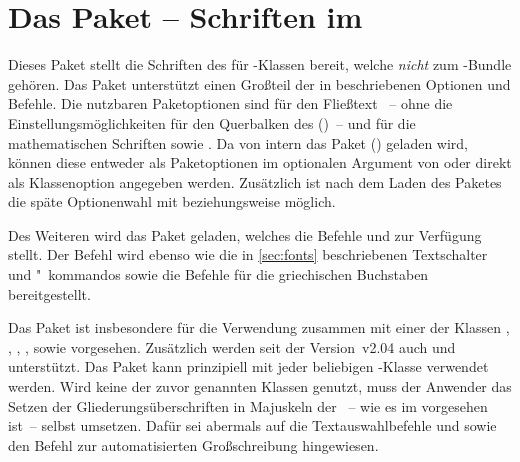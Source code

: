 \begin{Declaration*}{}
\bigskip\noindent
{}%
\end{Declaration*}



\section{Das Paket  -- Schriften im \CD}
\begin{Declaration*}[v2.02]{}
\printchangedatlist
%
Dieses Paket stellt die Schriften des \CDs für -Klassen bereit, 
welche \emph{nicht} zum \TUDScript-Bundle gehören. Das Paket unterstützt einen 
Großteil der in  beschriebenen Optionen und Befehle. Die 
nutzbaren Paketoptionen sind für den Fließtext ~-- ohne die 
Einstellungsmöglichkeiten für den Querbalken des \CDs ()~-- und 
für die mathematischen Schriften  sowie . 
Da von  intern das Paket () geladen 
wird, können diese entweder als Paketoptionen im optionalen Argument von 
 oder direkt 
als Klassenoption angegeben werden. Zusätzlich ist nach dem Laden des Paketes 
die späte Optionenwahl mit  beziehungsweise  
möglich.

Des Weiteren wird das Paket  geladen, welches die Befehle 
 und  zur Verfügung stellt. Der 
Befehl  wird ebenso wie die in \autoref{sec:fonts} beschriebenen 
Textschalter und "~kommandos sowie die Befehle für die griechischen Buchstaben 
bereitgestellt.

Das Paket  ist insbesondere für die Verwendung zusammen 
mit einer der Klassen , , , 
,  sowie  vorgesehen. Zusätzlich 
werden seit der Version~v2.04 
auch  und  unterstützt. Das Paket kann 
prinzipiell mit jeder beliebigen -Klasse verwendet werden. Wird 
keine der zuvor genannten Klassen genutzt, muss der Anwender das Setzen der 
Gliederungsüberschriften in Majuskeln der \DIN~-- wie es im \CD vorgesehen 
ist~-- selbst umsetzen. Dafür sei abermals auf die Textauswahlbefehle 
 und  sowie den Befehl  
zur automatisierten Großschreibung hingewiesen.


\end{Declaration*}
